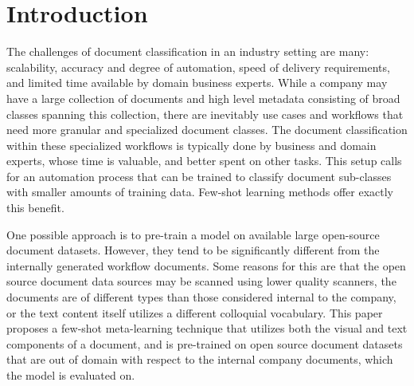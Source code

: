 \section{Introduction}
The challenges of document classification in an industry setting are many: scalability, accuracy and degree of automation, speed of delivery requirements, and limited time available by domain business experts. While a company may have a large collection of documents and high level metadata consisting of broad classes spanning this collection, there are inevitably use cases and workflows that need more granular and specialized document classes. The document classification within these specialized workflows is typically done by business and domain experts, whose time is valuable, and better spent on other tasks. This setup calls for an automation process that can be trained to classify document sub-classes with smaller amounts of training data. Few-shot learning methods offer exactly this benefit. 

One possible approach is to pre-train a model on available large open-source document datasets. However, they tend to be significantly different from the internally generated workflow documents. Some reasons for this are that the open source document data sources may be scanned using lower quality scanners, the documents are of different types than those considered internal to the company, or the text content itself utilizes a different colloquial vocabulary. This paper proposes a few-shot meta-learning technique that utilizes both the visual and text components of a document, and is pre-trained on open source document datasets that are out of domain with respect to the internal company documents, which the model is evaluated on.



